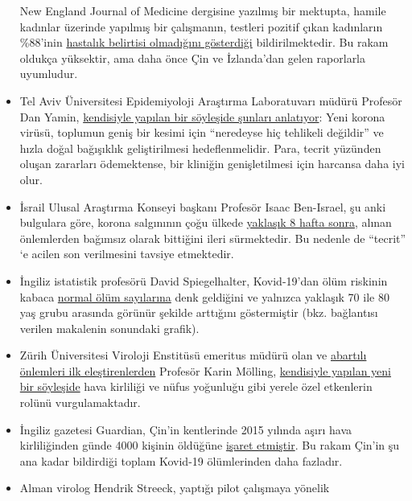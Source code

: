 \begin{itemize}
  New England Journal of Medicine dergisine yazılmış bir mektupta,
  hamile kadınlar üzerinde yapılmış bir çalışmanın, testleri pozitif
  çıkan kadınların \%88'inin
  \href{https://www.nejm.org/doi/full/10.1056/NEJMc2009316}{hastalık
  belirtisi olmadığını gösterdiği} bildirilmektedir. Bu rakam oldukça
  yüksektir, ama daha önce Çin ve İzlanda'dan gelen raporlarla
  uyumludur.
\item
  Tel Aviv Üniversitesi Epidemiyoloji Araştırma Laboratuvarı müdürü
  Profesör Dan Yamin,
  \href{https://www.ynet.co.il/articles/0,7340,L-5714371,00.html}{kendisiyle
  yapılan bir söyleşide şunları anlatıyor}: Yeni korona virüsü, toplumun
  geniş bir kesimi için ``neredeyse hiç tehlikeli değildir'' ve hızla
  doğal bağışıklık geliştirilmesi hedeflenmelidir. Para, tecrit yüzünden
  oluşan zararları ödemektense, bir kliniğin genişletilmesi için
  harcansa daha iyi olur.
\item
  İsrail Ulusal Araştırma Konseyi başkanı Profesör Isaac Ben-Israel, şu
  anki bulgulara göre, korona salgınının çoğu ülkede
  \href{http://www.israelnationalnews.com/News/News.aspx/278658}{yaklaşık
  8 hafta sonra}, alınan önlemlerden bağımsız olarak bittiğini ileri
  sürmektedir. Bu nedenle de ``tecrit'' `e acilen son verilmesini
  tavsiye etmektedir.
\item
  İngiliz istatistik profesörü David Spiegelhalter, Kovid-19'dan ölüm
  riskinin kabaca
  \href{https://medium.com/wintoncentre/how-much-normal-risk-does-covid-represent-4539118e1196}{normal
  ölüm sayılarına} denk geldiğini ve yalnızca yaklaşık 70 ile 80 yaş
  grubu arasında görünür şekilde arttığını göstermiştir (bkz. bağlantısı
  verilen makalenin sonundaki grafik).
\item
  Zürih Üniversitesi Viroloji Enstitüsü emeritus müdürü olan ve
  \href{https://www.rubikon.news/artikel/die-stimme-der-vernunft}{abartılı
  önlemleri ilk eleştirenlerden} Profesör Karin Mölling,
  \href{https://www.youtube.com/watch?v=4rl2sqLcDoQ}{kendisiyle yapılan
  yeni bir söyleşide} hava kirliliği ve nüfus yoğunluğu gibi yerele özel
  etkenlerin rolünü vurgulamaktadır.
\item
  İngiliz gazetesi Guardian, Çin'in kentlerinde 2015 yılında aşırı hava
  kirliliğinden günde 4000 kişinin öldüğüne
  \href{https://www.theguardian.com/world/2015/aug/14/air-pollution-in-china-is-killing-4000-people-every-day-a-new-study-finds}{işaret
  etmiştir}. Bu rakam Çin'in şu ana kadar bildirdiği toplam Kovid-19
  ölümlerinden daha fazladır.
\item
  Alman virolog Hendrik Streeck, yaptığı pilot çalışmaya yönelik

\end{itemize}
